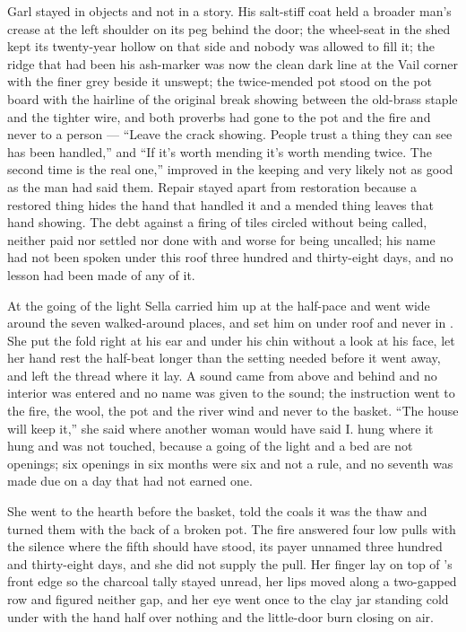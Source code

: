 Garl stayed in objects and not in a story. His salt-stiff coat held a broader man's crease at the left shoulder on its peg behind the door; the wheel-seat in the shed kept its twenty-year hollow on that side and nobody was allowed to fill it; the ridge that had been his ash-marker was now the clean dark line at the Vail corner with the finer grey beside it unswept; the twice-mended pot stood on the pot board with the hairline of the original break showing between the old-brass staple and the tighter wire, and both proverbs had gone to the pot and the fire and never to a person --- “Leave the crack showing. People trust a thing they can see has been handled,” and “If it's worth mending it's worth mending twice. The second time is the real one,” improved in the keeping and very likely not as good as the man had said them. Repair stayed apart from restoration because a restored thing hides the hand that handled it and a mended thing leaves that hand showing. The debt against a firing of tiles circled without being called, neither paid nor settled nor done with and worse for being uncalled; his name had not been spoken under this roof three hundred and thirty-eight days, and no lesson had been made of any of it.

\scenebreak

At the going of the light Sella carried him up at the half-pace and went wide around the seven walked-around places, and set him on  under  roof and never in . She put the fold right at his ear and under his chin without a look at his face, let her hand rest the half-beat longer than the setting needed before it went away, and left the thread where it lay. A sound came from above and behind and no interior was entered and no name was given to the sound; the instruction went to the fire, the wool, the pot and the river wind and never to the basket. “The house will keep it,” she said where another woman would have said I.  hung where it hung and was not touched, because a going of the light and a bed are not openings; six openings in six months were six and not a rule, and no seventh was made due on a day that had not earned one.

She went to the hearth before the basket, told the coals it was the thaw and turned them with the back of a broken pot. The fire answered four low pulls with the silence where the fifth should have stood, its payer unnamed three hundred and thirty-eight days, and she did not supply the pull. Her finger lay on top of 's front edge so the charcoal tally stayed unread, her lips moved along a two-gapped row and figured neither gap, and her eye went once to the clay jar standing cold under  with the hand half over nothing and the little-door burn closing on air.

